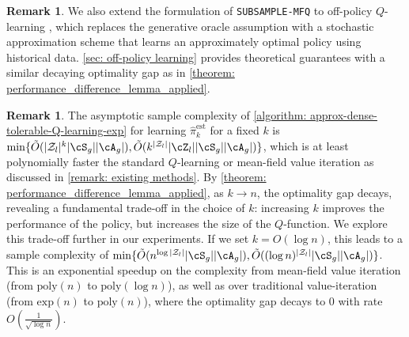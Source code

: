 \documentclass{article}
\theoremstyle{plain}
\theoremstyle{definition}
\newtheorem{remark}[theorem]{Remark}
\def\est{\mathrm{est}}
\begin{document}

\begin{remark} We also extend the formulation of \texttt{SUBSAMPLE-MFQ} to off-policy $Q$-learning \cite{chen2021lyapunov,chen2022sample}, which replaces the generative oracle assumption with a stochastic approximation scheme that learns an approximately optimal policy using historical data. \cref{sec: off-policy learning} provides theoretical guarantees with a similar decaying optimality gap as in \cref{theorem: performance_difference_lemma_applied}. \end{remark}


\begin{remark}\label{disussion: complexity requirement}
The asymptotic sample complexity of \cref{algorithm: approx-dense-tolerable-Q-learning-exp} for learning $\hat{\pi}^\est_{k}$ for a fixed $k$ is $\min\{\tilde{O}(|\mathcal{Z}_l|^k|\cS_g||\cA_g|),\tilde{O}(k^{|\mathcal{Z}_l|}|\cZ_l||\cS_g||\cA_g|)\}$, which is at least polynomially faster the standard $Q$-learning or mean-field value iteration as discussed in \cref{remark: existing methods}. By \cref{theorem: performance_difference_lemma_applied}, as $k\to n$, the optimality gap decays, revealing a fundamental trade-off in the choice of $k$: increasing $k$ improves the performance of the policy, but increases the size of the $Q$-function. We explore this trade-off further in our experiments. If we set $k=O(\log n)$, this leads to a sample complexity of $\min\{\tilde{O}(n^{\log|\mathcal{Z}_l|}|\cS_g||\cA_g|), \tilde{O}((\log n)^{|\mathcal{Z}_l|}|\cS_g||\cA_g|)\}$. This is an exponential speedup  on the complexity from mean-field value iteration (from $\mathrm{poly}(n)$ to $\mathrm{poly}(\log n)$), as well as over traditional value-iteration (from $\mathrm{exp}(n)$ to $\mathrm{poly}(n)$), where the optimality gap decays to $0$ with rate $O(\frac{1}{\sqrt{\log n}})$.
\end{remark}
\end{document}
